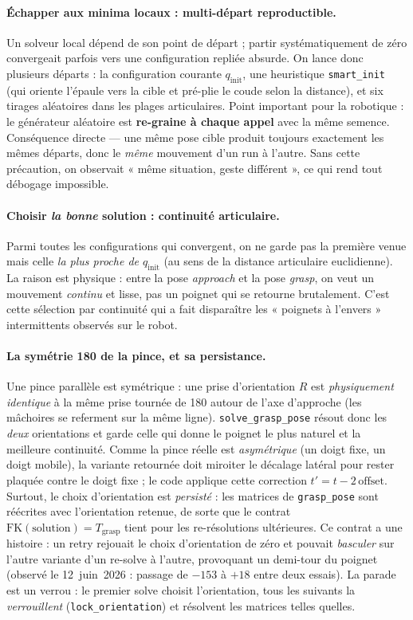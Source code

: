 \paragraph{Échapper aux minima locaux : multi-départ reproductible.} Un solveur
local dépend de son point de départ ; partir systématiquement de zéro convergeait
parfois vers une configuration repliée absurde. On lance donc plusieurs départs :
la configuration courante $q_{\text{init}}$, une heuristique \texttt{smart\_init}
(qui oriente l'épaule vers la cible et pré-plie le coude selon la distance), et
six tirages aléatoires dans les plages articulaires. Point important pour la
robotique : le générateur aléatoire est \textbf{re-graine à chaque appel} avec la
même semence. Conséquence directe — une même pose cible produit toujours
exactement les mêmes départs, donc le \emph{même} mouvement d'un run à l'autre.
Sans cette précaution, on observait « même situation, geste différent », ce qui
rend tout débogage impossible.

\paragraph{Choisir \emph{la bonne} solution : continuité articulaire.} Parmi
toutes les configurations qui convergent, on ne garde pas la première venue mais
celle \emph{la plus proche de $q_{\text{init}}$} (au sens de la distance
articulaire euclidienne). La raison est physique : entre la pose \textit{approach}
et la pose \textit{grasp}, on veut un mouvement \emph{continu} et lisse, pas un
poignet qui se retourne brutalement. C'est cette sélection par continuité qui a
fait disparaître les « poignets à l'envers » intermittents observés sur le robot.

\paragraph{La symétrie 180\textdegree{} de la pince, et sa persistance.} Une pince
parallèle est symétrique : une prise d'orientation $R$ est \emph{physiquement
identique} à la même prise tournée de 180\textdegree{} autour de l'axe d'approche
(les mâchoires se referment sur la même ligne). \texttt{solve\_grasp\_pose}
résout donc les \emph{deux} orientations et garde celle qui donne le poignet le
plus naturel et la meilleure continuité. Comme la pince réelle est
\emph{asymétrique} (un doigt fixe, un doigt mobile), la variante retournée doit
miroiter le décalage latéral pour rester plaquée contre le doigt fixe ; le code
applique cette correction $t' = t - 2\,\text{offset}$. Surtout, le choix
d'orientation est \emph{persisté} : les matrices de \texttt{grasp\_pose} sont
réécrites avec l'orientation retenue, de sorte que le contrat
$\mathrm{FK}(\text{solution}) = T_{\text{grasp}}$ tient pour les re-résolutions
ultérieures. Ce contrat a une histoire : un retry rejouait le choix d'orientation
de zéro et pouvait \emph{basculer} sur l'autre variante d'un re-solve à l'autre,
provoquant un demi-tour du poignet (observé le 12~juin~2026 : passage de
$-153$\textdegree{} à $+18$\textdegree{} entre deux essais). La parade est un
verrou : le premier solve choisit l'orientation, tous les suivants la
\emph{verrouillent} (\texttt{lock\_orientation}) et résolvent les matrices telles
quelles.


